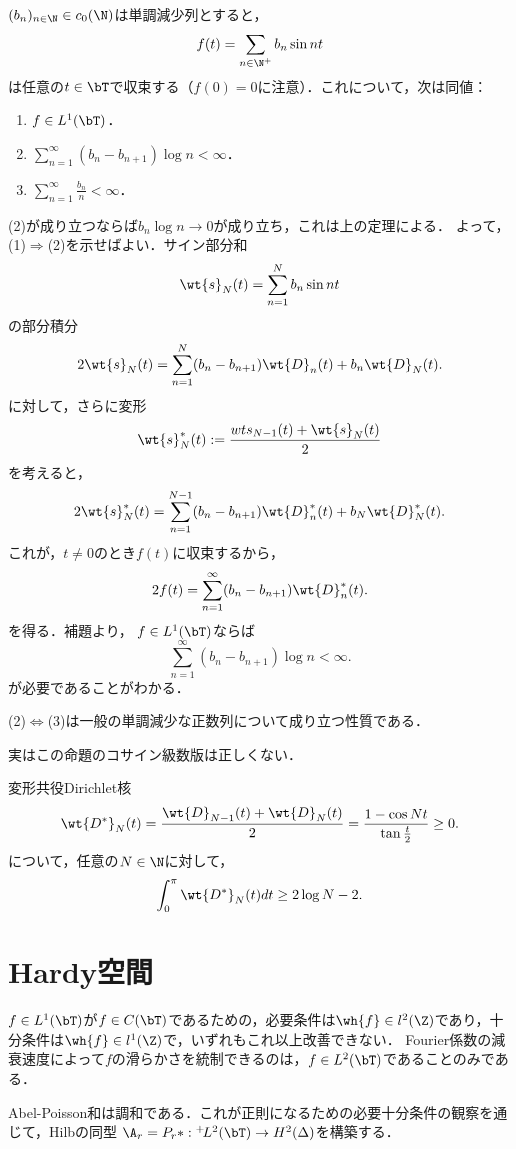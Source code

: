 \documentclass[uplatex,dvipdfmx]{jsreport}
\begin{document}
\begin{theorem}\label{thm-characterization-of-integrability-of-sine-series}
    $(b_n)_{n\in\N}\in c_0(\N)$は単調減少列とすると，
    \[f(t)=\sum_{n\in\N^+}b_n\sin nt\]
    は任意の$t\in\bT$で収束する（$f(0)=0$に注意）．これについて，次は同値：
    \begin{enumerate}
        \item $f\in L^1(\bT)$．
        \item $\sum_{n=1}^\infty(b_n-b_{n+1})\log n<\infty$．
        \item $\sum_{n=1}^\infty\frac{b_n}{n}<\infty$．
    \end{enumerate}
\end{theorem}
\begin{Proof}
    (2)が成り立つならば$b_n\log n\to0$が成り立ち，これは上の定理による．
    よって，(1)$\Rightarrow$(2)を示せばよい．サイン部分和
    \[\wt{s}_N(t)=\sum_{n=1}^Nb_n\sin nt\]
    の部分積分
    \[2\wt{s}_N(t)=\sum_{n=1}^N(b_n-b_{n+1})\wt{D}_n(t)+b_n\wt{D}_N(t).\]
    に対して，さらに変形
    \[\wt{s}^*_N(t):=\frac{wt{s}_{N-1}(t)+\wt{s}_N(t)}{2}\]
    を考えると，
    \[2\wt{s}^*_N(t)=\sum_{n=1}^{N-1}(b_n-b_{n+1})\wt{D}^*_n(t)+b_N\wt{D}^*_N(t).\]
    これが，$t\ne0$のとき$f(t)$に収束するから，
    \[2f(t)=\sum_{n=1}^\infty(b_n-b_{n+1})\wt{D}^*_n(t).\]
    を得る．補題より，
    $f\in L^1(\bT)$ならば
    \[\sum_{n=1}^\infty(b_n-b_{n+1})\log n<\infty.\]
    が必要であることがわかる．

    (2)$\Leftrightarrow$(3)は一般の単調減少な正数列について成り立つ性質である．
\end{Proof}
\begin{remarks}
    実はこの命題のコサイン級数版は正しくない．
\end{remarks}

\begin{lemma}
    変形共役Dirichlet核
    \[\wt{D^*}_N(t)=\frac{\wt{D}_{N-1}(t)+\wt{D}_N(t)}{2}=\frac{1-\cos Nt}{\tan\frac{t}{2}}\ge0.\]
    について，任意の$N\in\N$に対して，
    \[\int^\pi_0\wt{D^*}_N(t)dt\ge2\log N-2.\]
\end{lemma}

\section{Hardy空間}

\begin{tcolorbox}[colframe=ForestGreen, colback=ForestGreen!10!white,breakable,colbacktitle=ForestGreen!40!white,coltitle=black,fonttitle=\bfseries\sffamily,
title=]
    $f\in L^1(\bT)$が$f\in C(\bT)$であるための，必要条件は$\wh{f}\in l^2(\Z)$であり，十分条件は$\wh{f}\in l^1(\Z)$で，いずれもこれ以上改善できない．
    Fourier係数の減衰速度によって$f$の滑らかさを統制できるのは，$f\in L^2(\bT)$であることのみである．

    Abel-Poisson和は調和である．これが正則になるための必要十分条件の観察を通じて，Hilbの同型
    $\A_r=P_r*:{}^+\!L^2(\bT)\to H^2(\Delta)$を構築する．
\end{tcolorbox}
\end{document}
